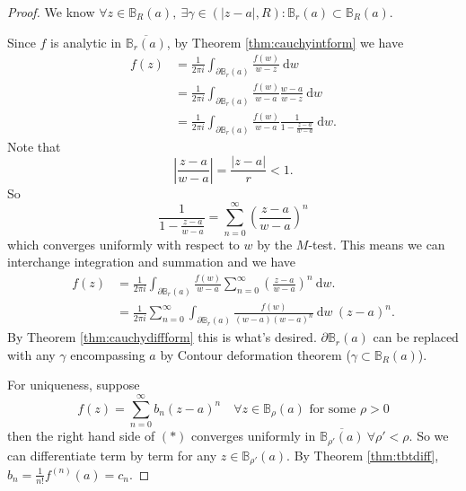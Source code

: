 \documentclass[a4paper]{article}
\theoremstyle{definition}
\begin{document}
\begin{proof}
We know $\forall z\in \mathbb B_R(a),\ \exists \gamma \in (|z-a|,R):\mathbb B_r(a) \subset \mathbb B_R(a)$.
\begin{center}
\end{center}

Since $f$ is analytic in $\overline{\mathbb B_r(a)}$, by Theorem \ref{thm:cauchyintform} we have
\[
\begin{aligned}
f(z) &= \frac{1}{2\pi i} \int_{\partial \mathbb B_r(a)} \frac{f(w)}{w-z} \ \mathrm d w\\
&= \frac{1}{2\pi i} \int_{\partial \mathbb B_r(a)} \frac{f(w)}{w-a} \frac{w-a}{w-z} \ \mathrm d w \\
&=\frac{1}{2\pi i} \int_{\partial \mathbb B_r(a)} \frac{f(w)}{w-a} \frac{1}{1-\frac{z-a}{w-a}} \ \mathrm d w.
\end{aligned}
\]
Note that
\[
\left| \frac{z-a}{w-a} \right| = \frac{|z-a|}{r} <1.
\]
So
\[
\frac{1}{1-\frac{z-a}{w-a}} = \sum_{n=0}^\infty \left( \frac{z-a}{w-a}\right)^n
\]
which converges uniformly with respect to $w$ by the $M$-test. This means we can interchange integration and summation and we have
\[
\begin{aligned}
f(z) &= \frac{1}{2\pi i} \int_{\partial \mathbb B_r(a)} \frac{f(w)}{w-a} \sum_{n=0}^\infty \left( \frac{z-a}{w-a}\right)^n \ \mathrm d w. \\
&= \frac{1}{2\pi i} \sum_{n=0}^\infty \int_{\partial \mathbb B_r(a)} \frac{f(w)}{(w-a)(w-a)^n}\ \mathrm d w \ (z-a)^n.
\end{aligned}
\]
By Theorem \ref{thm:cauchydiffform} this is what's desired. $\partial \mathbb B_r(a)$ can be replaced with any $\gamma$ encompassing $a$ by Contour deformation theorem ($\gamma \subset \mathbb B_R(a)$).

For uniqueness, suppose
\[
f(z) = \sum_{n=0}^\infty b_n (z-a)^n \quad \forall z\in \mathbb B_{\rho}(a) \text{ for some }\rho>0
\tag{$\ast$}
\]
then the right hand side of $(\ast)$ converges uniformly in $\overline{\mathbb B_{\rho'} (a)} \ \forall \rho '<\rho$. So we can differentiate term by term for any $z\in \mathbb B_{\rho'} (a)$. By Theorem \ref{thm:tbtdiff}, $b_n=\frac{1}{n!} f^{(n)}(a)=c_n$.
\end{proof}
\end{document}
